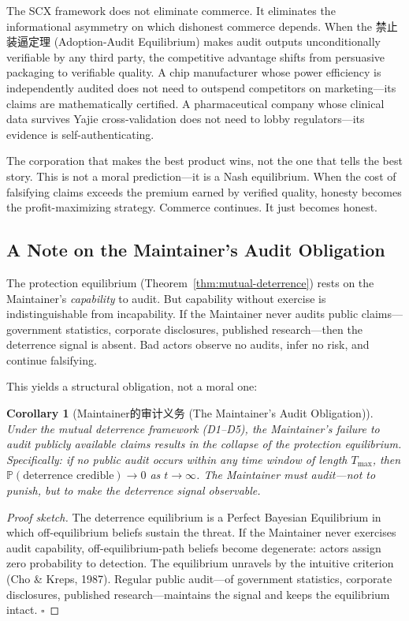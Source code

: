 \documentclass[12pt,a4paper]{ctexart}
\newtheorem{corollary}[theorem]{Corollary}
\theoremstyle{definition}
\theoremstyle{remark}
\begin{document}
The SCX framework does not eliminate commerce. It eliminates the informational asymmetry on which dishonest commerce depends. When the 禁止装逼定理 (Adoption-Audit Equilibrium) makes audit outputs unconditionally verifiable by any third party, the competitive advantage shifts from persuasive packaging to verifiable quality. A chip manufacturer whose power efficiency is independently audited does not need to outspend competitors on marketing—its claims are mathematically certified. A pharmaceutical company whose clinical data survives Yajie cross-validation does not need to lobby regulators—its evidence is self-authenticating.

The corporation that makes the best product wins, not the one that tells the best story. This is not a moral prediction—it is a Nash equilibrium. When the cost of falsifying claims exceeds the premium earned by verified quality, honesty becomes the profit-maximizing strategy. Commerce continues. It just becomes honest.

\subsection{A Note on the Maintainer's Audit Obligation}

The protection equilibrium (Theorem~\ref{thm:mutual-deterrence}) rests on the Maintainer's \textit{capability} to audit. But capability without exercise is indistinguishable from incapability. If the Maintainer never audits public claims—government statistics, corporate disclosures, published research—then the deterrence signal is absent. Bad actors observe no audits, infer no risk, and continue falsifying.

This yields a structural obligation, not a moral one:

\begin{corollary}[Maintainer的审计义务 (The Maintainer's Audit Obligation)]
\label{cor:audit-obligation}
Under the mutual deterrence framework (D1--D5), the Maintainer's failure to audit publicly available claims results in the collapse of the protection equilibrium. Specifically: if no public audit occurs within any time window of length $T_{\max}$, then $\mathbb{P}(\text{deterrence credible}) \to 0$ as $t \to \infty$. The Maintainer must audit—not to punish, but to make the deterrence signal observable.
\end{corollary}

\begin{proof}[Proof sketch]
The deterrence equilibrium is a Perfect Bayesian Equilibrium in which off-equilibrium beliefs sustain the threat. If the Maintainer never exercises audit capability, off-equilibrium-path beliefs become degenerate: actors assign zero probability to detection. The equilibrium unravels by the intuitive criterion (Cho \& Kreps, 1987). Regular public audit—of government statistics, corporate disclosures, published research—maintains the signal and keeps the equilibrium intact. $\square$
\end{proof}
\end{document}
